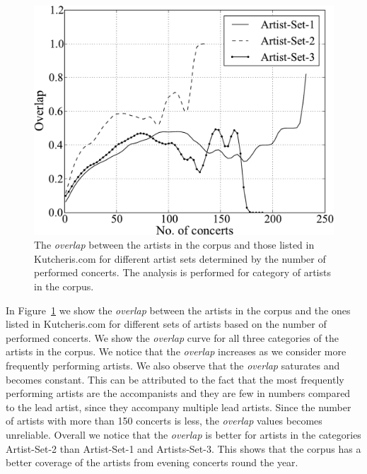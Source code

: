 \begin{figure}
	\begin{center}
		\includegraphics[width=\figSizeHundred]{ch04_datasets/figures/artist-coverage-vs-performances.pdf}
	\end{center}
	\caption{The \textit{overlap} between the artists in the corpus and those listed in Kutcheris.com for different artist sets determined by the number of performed concerts. The analysis is performed for category of artists in the corpus.}
	\label{fig:artist_coverage_vs_number_of_concerts}
\end{figure}

In Figure~\ref{fig:artist_coverage_vs_number_of_concerts} we show the \textit{overlap} between the artists in the corpus and the ones listed in Kutcheris.com for different sets of artists based on the number of performed concerts. We show the \textit{overlap} curve for all three categories of the artists in the corpus. We notice that the \textit{overlap} increases as we consider more frequently performing artists. We also observe that the \textit{overlap} saturates and becomes constant. This can be attributed to the fact that the most frequently performing artists are the accompanists and they are few in numbers compared to the lead artist, since they accompany multiple lead artists. Since the number of artists with more than 150 concerts is less, the \textit{overlap}
values becomes unreliable. Overall we notice that the \textit{overlap} is better for artists in the categories Artist-Set-2 than Artist-Set-1 and Artists-Set-3. This shows that the corpus has a better coverage of the artists from evening concerts round the year.

